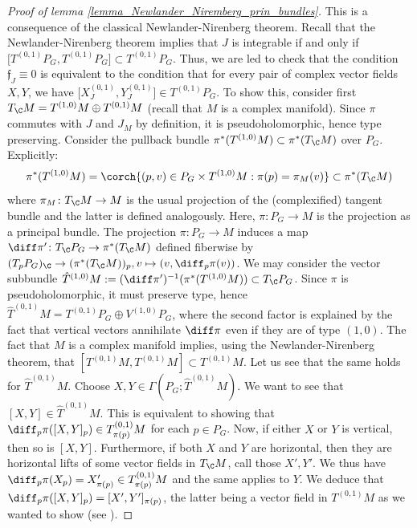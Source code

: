 \begin{proof}[\textit{Proof of lemma} \ref{lemma_Newlander_Niremberg_prin_bundles}]
    This is a consequence of the classical Newlander-Nirenberg theorem. Recall that the Newlander-Nirenberg theorem implies that \(J\) is integrable if and only if \(\big[T^{(0,1)}P_G, T^{(0,1)}P_G\big]\subset T^{(0,1)}P_G\). Thus, we are led to check that the condition \(\mathfrak{f}_J\equiv 0\) is equivalent to the condition that for every pair of complex vector fields \(X,Y\), we have \(\big[X_J^{(0,1)}, Y_J^{(0,1)}\big] \in T^{(0,1)}P_G\). To show this, consider first \(T_\C M=T^{(1,0)}M \oplus T^{(0,1)}M\) (recall that \(M\) is a complex manifold). Since \(\pi\) commutes with \(J\) and \(J_M\) by definition, it is pseudoholomorphic, hence type preserving. Consider the pullback bundle \(\pi^*(T^{(1,0)}M)\subset \pi^*(T_\C M)\) over \(P_G\). Explicitly:
    \[
    \pi^*(T^{(1,0)}M)=\corch{(p, v)\in P_G \times T^{(1,0)}M: \pi(p)=\pi_M(v)}  \subset \pi^*(T_\C M)
    \]
    where \(\pi_M\colon T_\C M \to M\) is the usual projection of the (complexified) tangent bundle and the latter is defined analogously. Here, \(\pi\colon P_G \to M\) is the projection as a principal bundle. The projection \(\pi\colon P_G \to M\) induces a map \(\diff \pi'\colon T_\C P_G \to \pi^*(T_\C M)\) defined fiberwise by \((T_pP_G)_\C\to (\pi^*(T_\C M))_p, v \mapsto (v, \diff_p\pi(v))\). We may consider the vector subbundle \(\hat{T}^{(1,0)}M:=(\diff\pi')^{-1}(\pi^*(T^{(1,0)}M))\subset T_\C P_G\). Since \(\pi\) is pseudoholomorphic, it must preserve type, hence \(\hat{T}^{(0,1)}M=T^{(0,1)}P_G \oplus V^{(1,0)}P_G\), where the second factor is explained by the fact that vertical vectors annihilate \(\diff \pi\) even if they are of type \((1,0)\). The fact that \(M\) is a complex manifold implies, using the Newlander-Nirenberg theorem, that \([T^{(0,1)}M, T^{(0,1)}M]\subset T^{(0,1)}M\). Let us see that the same holds for \(\hat{T}^{(0,1)}M\). Choose \(X, Y \in \Gamma(P_G; \hat{T}^{(0,1)}M)\). We want to see that \([X, Y]\in \hat{T}^{(0,1)}M\). This is equivalent to showing that \(\diff_p\pi([X,Y]_p)\in T_{\pi(p)}^{(0,1)}M\) for each \(p\in P_G\). Now, if either \(X\) or \(Y\) is vertical, then so is \([X,Y]\). Furthermore, if both \(X\) and \(Y\) are horizontal, then they are horizontal lifts of some vector fields in \(T_\C M\), call those \(X', Y'\). We thus have \(\diff_p \pi(X_p)=X'_{\pi(p)}\in T_{\pi(p)}^{(0,1)}M\) and the same applies to \(Y\). We deduce that \(\diff_p\pi ([X,Y]_p)=[X', Y']_{\pi(p)}\), the latter being a vector field in \(T^{(0,1)}M\) as we wanted to show (see \parencite[Prop. 8.30]{lee_introSM}).   
    

\end{proof}
